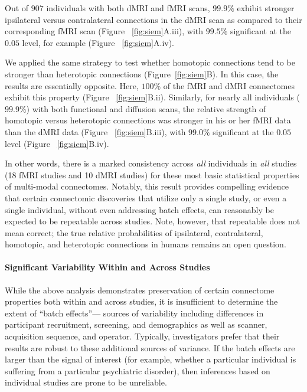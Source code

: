 \documentclass[11pt]{article}
\begin{document}
\begin{multicols}{2}
Out of $907$ individuals with both dMRI and fMRI scans, $99.9\%$ exhibit  stronger ipsilateral versus contralateral connections in the dMRI scan as compared to their corresponding fMRI scan (Figure ~\ref{fig:siem}A.iii), with $99.5\%$ significant at the $0.05$ level, for example (Figure ~\ref{fig:siem}A.iv).

We applied the same strategy to test whether homotopic connections tend to be stronger than heterotopic connections (Figure~\ref{fig:siem}B). In this case, the results are essentially opposite. Here, $100\%$ of the fMRI and dMRI connectomes exhibit this property (Figure ~\ref{fig:siem}B.ii). Similarly, for nearly all individuals ($99.9\%$) with both functional and diffusion scans, the relative strength of homotopic versus heterotopic connections was stronger in his or her fMRI data than the dMRI data (Figure ~\ref{fig:siem}B.iii), with $99.0\%$ significant at the $0.05$ level (Figure ~\ref{fig:siem}B.iv).  


In other words, there is a marked consistency across \emph{all} individuals in \emph{all} studies (18 fMRI studies and 10 dMRI studies) for these most basic statistical properties of multi-modal connectomes. Notably, this result provides compelling evidence that certain connectomic discoveries that utilize only a single study, or even a single individual, without even addressing batch effects, can reasonably be expected to be repeatable across studies. Note, however, that repeatable does not mean correct; the true relative probabilities of ipsilateral, contralateral, homotopic, and heterotopic connections in humans remains an open question. 






\paragraph{Significant Variability Within and Across Studies}

While the above analysis demonstrates preservation of certain connectome properties both within and across studies, it is insufficient to determine the extent of ``batch effects''--- sources of variability including differences in participant recruitment, screening, and demographics as well as scanner, acquisition sequence, and operator.  Typically, investigators prefer that their results are robust to these additional sources of variance.
 If the batch effects are larger than the signal of interest (for example, whether a particular individual is suffering from a particular psychiatric disorder), then inferences based on individual studies are prone to be unreliable.  
%


\end{multicols}
\end{document}
